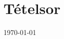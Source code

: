 \documentclass[a4paper]{article}
\begin{document}
%
%
%
%
%
%

\newpage
\section{Tételsor}

\today
\end{document}
